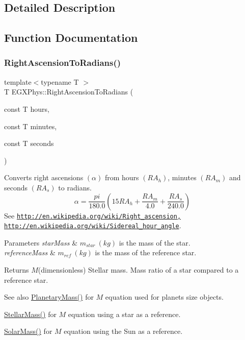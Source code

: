 \subsection{Detailed Description}


\subsection{Function Documentation}
\mbox{\label{group___right_ascension_and_declination_ga25cb93de046663967af01d6687c423ae}} 
\subsubsection{\texorpdfstring{Right\+Ascension\+To\+Radians()}{RightAscensionToRadians()}}
{\footnotesize\ttfamily template$<$typename T $>$ \\
T E\+G\+X\+Phys\+::\+Right\+Ascension\+To\+Radians (\begin{DoxyParamCaption}\item[{const T}]{hours,  }\item[{const T}]{minutes,  }\item[{const T}]{seconds }\end{DoxyParamCaption})}



Converts right ascensions $(\alpha)$ from hours $(RA_h)$, minutes $(RA_m)$ and seconds $(RA_s)$ to radians. \[\alpha=\frac{pi}{180.0}(15 RA_h + \frac{RA_m}{4.0} + \frac{RA_s}{240.0})\] See \href{http://en.wikipedia.org/wiki/Right_ascension,}{\tt http\+://en.\+wikipedia.\+org/wiki/\+Right\+\_\+ascension,} \href{http://en.wikipedia.org/wiki/Sidereal_hour_angle}{\tt http\+://en.\+wikipedia.\+org/wiki/\+Sidereal\+\_\+hour\+\_\+angle}. 


\begin{DoxyParams}{Parameters}
{\em star\+Mass} & $m_{star}\ (kg)$ is the mass of the star. \\
\hline
{\em reference\+Mass} & $m_{ref}\ (kg)$ is the mass of the reference star. \\
\hline
\end{DoxyParams}
\begin{DoxyReturn}{Returns}
$M$(dimensionless) Stellar mass. Mass ratio of a star compared to a reference star. 
\end{DoxyReturn}
\begin{DoxySeeAlso}{See also}
\mbox{\hyperlink{group___planetary_mass_ga225bcf56fb37468f6d4d46493d403503}{Planetary\+Mass()}} for $M$ equation used for planets size objects. 

\mbox{\hyperlink{group___b_v_color_gabbd6081cd3bfb0153d7470d58f733a61}{Stellar\+Mass()}} for $M$ equation using a star as a reference. 

\mbox{\hyperlink{group___b_v_color_gac393d64d586be3dc76ac7a98ac336514}{Solar\+Mass()}} for $M$ equation using the Sun as a reference. 
\end{DoxySeeAlso}
